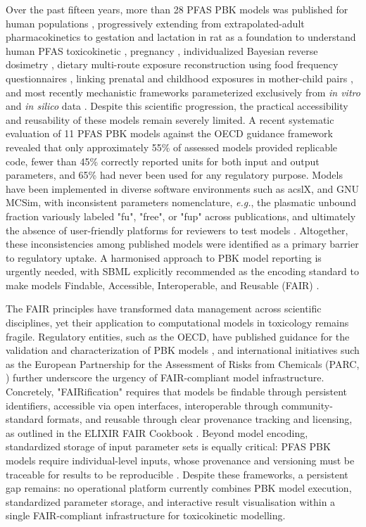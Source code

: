 \documentclass[preprint,12pt]{elsarticle}
\begin{document}
\begin{linenumbers}
Over the past fifteen years, more than 28 PFAS PBK models was published for human populations \citep{deepika2025}, progressively extending from extrapolated-adult pharmacokinetics \citep{loccisano2011} to gestation and lactation in rat as a foundation to understand human PFAS toxicokinetic \citep{loccisano2013}, 
pregnancy \citep{verner2015}, 
individualized Bayesian reverse dosimetry \citep{brochot2019}, 
dietary multi-route exposure reconstruction using food frequency questionnaires \citep{rovira2019}, 
linking prenatal and childhood exposures in mother-child pairs \citep{ratier2024,ouidir2025}, 
and most recently mechanistic frameworks parameterized exclusively from \textit{in vitro} and \textit{in silico} data \citep{pachoulide2026}. 
Despite this scientific progression, the practical accessibility and reusability of these models remain severely limited. A recent systematic evaluation of 11 PFAS PBK models against the OECD guidance framework \citep{deepika2025} revealed that only approximately 55\% of assessed models provided replicable code, fewer than 45\% correctly reported units for both input and output parameters, and 65\% had never been used for any regulatory purpose. 
Models have been implemented in diverse software environments such as acslX, and GNU MCSim, with inconsistent parameters nomenclature, \textit{e.g.}, the plasmatic unbound fraction variously labeled "fu", "free", or "fup" across publications, and ultimately the absence of user-friendly platforms for reviewers to test models \citep{deepika2025}. Altogether, these inconsistencies among published models were identified as a primary barrier to regulatory uptake. 
A harmonised approach to PBK model reporting is urgently needed, with SBML \citep{hucka2003} explicitly recommended as the encoding standard to make models Findable, Accessible, Interoperable, and Reusable (FAIR) \citep{deepika2025}.

The FAIR principles \citep{wilkinson2016} have transformed data management across scientific disciplines, yet their application to computational models in toxicology remains fragile. Regulatory entities, such as the OECD, have published guidance for the validation and characterization of PBK models \citep{OECD2021}, and international initiatives such as the European Partnership for the Assessment of Risks from Chemicals (PARC, \citep{Ratier2023}) further underscore the urgency of FAIR-compliant model infrastructure. 
Concretely, "FAIRification" requires that models be findable through persistent identifiers, accessible via open interfaces, interoperable through community-standard formats, and reusable through clear provenance tracking and licensing, as outlined in the ELIXIR FAIR Cookbook \citep{rocca2023}. 
Beyond model encoding, standardized storage of input parameter sets is equally critical: PFAS PBK models require individual-level inputs, whose provenance and versioning must be traceable for results to be reproducible \citep{brochot2019,ratier2024}. Despite these frameworks, a persistent gap remains: no operational platform currently combines PBK model execution, standardized parameter storage, and interactive result visualisation within a single FAIR-compliant infrastructure for toxicokinetic modelling.


\end{linenumbers}
\end{document}
